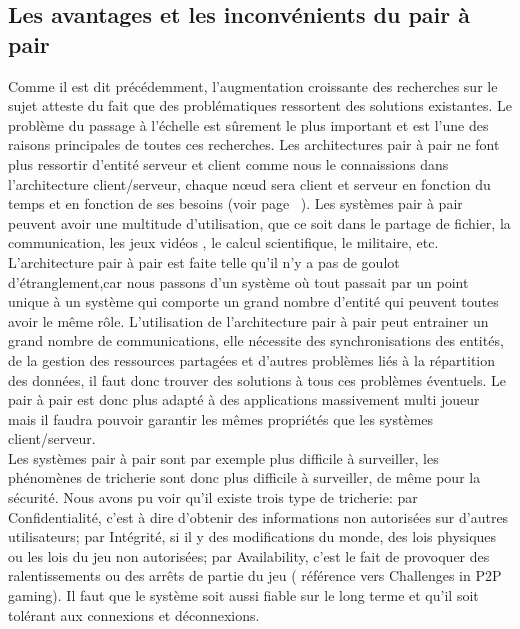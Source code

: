 	\subsection{Les avantages et les inconvénients du pair à pair}
	Comme il est dit précédemment, l'augmentation croissante des recherches sur le sujet atteste du fait que des problématiques ressortent des solutions existantes. Le problème du passage à l'échelle est sûrement le plus important et est l'une des raisons principales de toutes ces recherches. Les architectures pair à pair ne font plus ressortir d'entité serveur et client comme nous le connaissions dans l'architecture client/serveur, chaque nœud sera client et serveur en fonction du temps et en fonction de ses besoins (voir page ~\pageref{P2P/ClServ}). Les systèmes pair à pair peuvent avoir une multitude d'utilisation, que ce soit dans le partage de fichier, la communication, les jeux vidéos , le calcul scientifique, le militaire, etc. \\
	L'architecture pair à pair est faite telle qu'il n'y a pas de goulot d'étranglement,car nous passons d'un système où tout passait par un point unique à un système qui comporte un grand nombre d'entité qui peuvent toutes avoir le même rôle. L'utilisation de l'architecture pair à pair peut entrainer un grand nombre de communications, elle nécessite des synchronisations des entités, de la gestion des ressources partagées et d'autres problèmes liés à la répartition des données, il faut donc trouver des solutions à tous ces problèmes éventuels. Le pair à pair est donc plus adapté à des applications massivement multi joueur mais il faudra pouvoir garantir les mêmes propriétés que les systèmes client/serveur. \\
	Les systèmes pair à pair sont par exemple plus difficile à surveiller, les phénomènes de tricherie sont donc plus difficile à surveiller, de même pour la sécurité. Nous avons pu voir qu'il existe trois type de tricherie: par Confidentialité, c'est à dire d'obtenir des informations non autorisées sur d'autres utilisateurs; par Intégrité, si il y des modifications du monde, des lois physiques ou les lois du jeu non autorisées; par Availability, c'est le fait de provoquer des ralentissements ou des arrêts de partie du jeu ( référence vers Challenges in P2P gaming). Il faut que le système soit aussi fiable sur le long terme et qu'il soit tolérant aux connexions et déconnexions.\\
	
